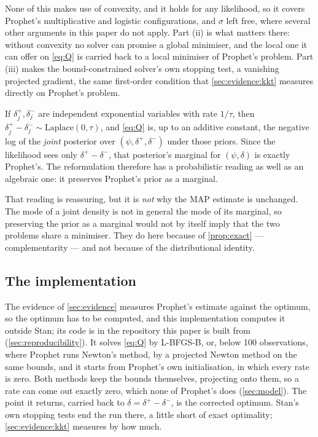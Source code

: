 None of this makes use of convexity, and it holds for any likelihood, so it covers
Prophet's multiplicative and logistic configurations, and $\sigma$ left free, where
several other arguments in this paper do not apply. Part (ii) is what matters there:
without convexity no solver can promise a global minimiser, and the local one it can
offer on \eqref{eq:Q} is carried back to a local minimiser of Prophet's problem.
Part (iii) makes the bound-constrained solver's own stopping test, a vanishing
projected gradient, the same first-order condition that
\cref{sec:evidence:kkt} measures directly on Prophet's problem.

\begin{remark}
\label{rem:exponential}
If $\delta^+_j, \delta^-_j$ are independent exponential variables with rate
$1/\tau$, then $\delta^+_j - \delta^-_j \sim \mathrm{Laplace}(0, \tau)$, and
\eqref{eq:Q} is, up to an additive constant, the negative log of the \emph{joint}
posterior over $(\psi, \delta^+, \delta^-)$ under those priors. Since the
likelihood sees only $\delta^+ - \delta^-$, that posterior's marginal for
$(\psi, \delta)$ is exactly Prophet's. The reformulation therefore has a
probabilistic reading as well as an algebraic one: it preserves Prophet's prior
as a marginal.

That reading is reassuring, but it is \emph{not} why the MAP estimate is
unchanged. The mode of a joint density is not in general the mode of its
marginal, so preserving the prior as a marginal would not by itself imply that
the two problems share a minimiser. They do here because of
\cref{prop:exact} --- complementarity --- and not because of the distributional
identity.
\end{remark}

\subsection{The implementation}
\label{sec:implementation}

The evidence of \cref{sec:evidence} measures Prophet's estimate against the optimum,
so the optimum has to be computed, and this implementation computes it outside Stan;
its code is in the repository this paper is built from (\cref{sec:reproducibility}).
It solves \eqref{eq:Q} by L-BFGS-B, or, below 100 observations, where Prophet runs
Newton's method, by a projected Newton method on the same bounds, and it starts from
Prophet's own initialisation, in which every rate is zero. Both methods keep the
bounds themselves, projecting onto them, so a rate can come out exactly zero, which
none of Prophet's does (\cref{sec:model}). The point it returns, carried back to
$\delta = \delta^+ - \delta^-$, is the corrected optimum. Stan's own stopping tests
end the run there, a little short of exact optimality; \cref{sec:evidence:kkt}
measures by how much.

